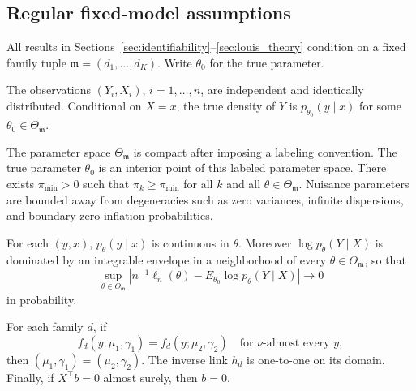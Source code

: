 \subsection{Regular fixed-model assumptions}

All results in Sections~\ref{sec:identifiability}--\ref{sec:louis_theory}
condition on a fixed family tuple \(\mathfrak m=(d_1,\ldots,d_K)\).  Write
\(\theta_0\) for the true parameter.

\begin{assumption}[Sampling]
\label{ass:sampling}
The observations \((Y_i,X_i)\), \(i=1,\ldots,n\), are independent and
identically distributed.  Conditional on \(X=x\), the true density of \(Y\) is
\(p_{\theta_0}(y\mid x)\) for some \(\theta_0\in\Theta_{\mathfrak m}\).
\end{assumption}

\begin{assumption}
\label{ass:param_space}
The parameter space \(\Theta_{\mathfrak m}\) is compact after imposing a
labeling convention.  The true parameter \(\theta_0\) is an interior point of
this labeled parameter space.  There exists \(\pi_{\min}>0\) such that
\(\pi_k\ge \pi_{\min}\) for all \(k\) and all \(\theta\in\Theta_{\mathfrak m}\).
Nuisance parameters are bounded away from degeneracies such as zero variances,
infinite dispersions, and boundary zero-inflation probabilities.
\end{assumption}

\begin{assumption}
\label{ass:continuity}
For each \((y,x)\), \(p_\theta(y\mid x)\) is continuous in \(\theta\).  Moreover
\(\log p_\theta(Y\mid X)\) is dominated by an integrable envelope in a
neighborhood of every \(\theta\in\Theta_{\mathfrak m}\), so that
\[
    \sup_{\theta\in\Theta_{\mathfrak m}}
    \left|
    n^{-1}\ell_n(\theta)
    -
    E_{\theta_0}\log p_\theta(Y\mid X)
    \right|
    \to 0
\]
in probability.
\end{assumption}

\begin{assumption}
\label{ass:primitive_component}
For each family \(d\), if
\[
    f_d(y;\mu_1,\gamma_1)=f_d(y;\mu_2,\gamma_2)
    \quad\text{for \(\nu\)-almost every }y,
\]
then \((\mu_1,\gamma_1)=(\mu_2,\gamma_2)\).  The inverse link \(h_d\) is
one-to-one on its domain.  Finally, if \(X^\top b=0\) almost surely, then
\(b=0\).
\end{assumption}

